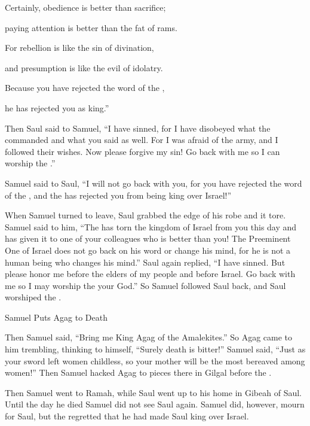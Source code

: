 {\par }{\Q Certainly,
obedience
is better than sacrifice;
\par }{\Q paying attention
is better
than the fat
of rams.
\par }{\Q {}For
rebellion
is like the sin
of divination,
\par }{\Q and presumption
is like the evil
of idolatry.
\par }{\Q Because
you have rejected
the word
of the {},
\par }{\Q he has rejected
you as king.”
\par }{\PP {}Then Saul
said to
Samuel,
“I have sinned,
for
I have
disobeyed
what the
{}
commanded
and what
you said as well. For
I was afraid
of the
army, and I followed their wishes.
Now
please
forgive
my sin! Go back
with
me so I can worship
the {}.”
\par }{\PP {}Samuel
said
to
Saul,
“I will not
go back
with
you, for
you have rejected
the
word
of the {}, and the
{}
has rejected
you from being king
over
Israel!”
\par }{\PP {}When Samuel
turned
to leave,
Saul grabbed
the edge
of his robe
and it tore.
Samuel
said
to him,
“The
{}
has torn
the
kingdom
of Israel
from you this day
and has given
it to one
of your colleagues
who is better
than you!
The Preeminent One
of Israel
does not
go back on his word
or
change
his mind, for
he is
not
a human
being who changes
his mind.”
Saul again replied,
“I have sinned.
But
please
honor
me before
the elders
of my people
and before
Israel.
Go back
with
me so I may worship
the {}
your God.”
So Samuel
followed
Saul
back,
and Saul
worshiped
the {}.
\par }{\SH Samuel Puts Agag to Death
\par }{\PP {}Then Samuel
said,
“Bring
me King
Agag
of the Amalekites.”
So Agag
came
to
him trembling,
thinking
to himself, “Surely
death
is bitter!”
Samuel
said,
“Just
as your sword
left women
childless,
so
your
mother
will be the most bereaved
among women!” Then Samuel
hacked
Agag
to pieces there in Gilgal
before
the {}.
\par }{\PP {}Then Samuel
went
to Ramah,
while Saul
went up
to
his home
in Gibeah
of Saul.
Until
the day
he died
Samuel
did not
see
Saul
again.
Samuel
did, however, mourn
for
Saul,
but the
{}
regretted
that
he had made
Saul
king over
Israel.

}
